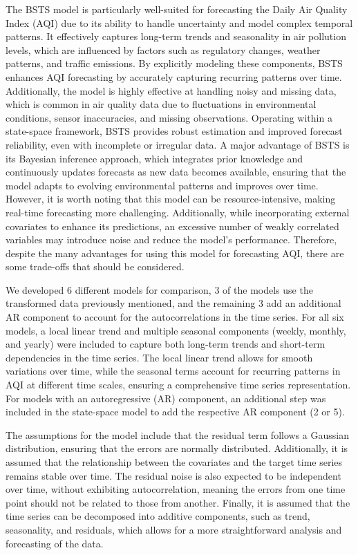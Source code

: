\documentclass[
  12pt,
]{article}
\begin{document}
The BSTS model is particularly well-suited for forecasting the Daily Air
Quality Index (AQI) due to its ability to handle uncertainty and model
complex temporal patterns. It effectively captures long-term trends and
seasonality in air pollution levels, which are influenced by factors
such as regulatory changes, weather patterns, and traffic emissions. By
explicitly modeling these components, BSTS enhances AQI forecasting by
accurately capturing recurring patterns over time. Additionally, the
model is highly effective at handling noisy and missing data, which is
common in air quality data due to fluctuations in environmental
conditions, sensor inaccuracies, and missing observations. Operating
within a state-space framework, BSTS provides robust estimation and
improved forecast reliability, even with incomplete or irregular data. A
major advantage of BSTS is its Bayesian inference approach, which
integrates prior knowledge and continuously updates forecasts as new
data becomes available, ensuring that the model adapts to evolving
environmental patterns and improves over time. However, it is worth
noting that this model can be resource-intensive, making real-time
forecasting more challenging. Additionally, while incorporating external
covariates to enhance its predictions, an excessive number of weakly
correlated variables may introduce noise and reduce the model's
performance. Therefore, despite the many advantages for using this model
for forecasting AQI, there are some trade-offs that should be
considered.

We developed 6 different models for comparison, 3 of the models use the
transformed data previously mentioned, and the remaining 3 add an
additional AR component to account for the autocorrelations in the time
series. For all six models, a local linear trend and multiple seasonal
components (weekly, monthly, and yearly) were included to capture both
long-term trends and short-term dependencies in the time series. The
local linear trend allows for smooth variations over time, while the
seasonal terms account for recurring patterns in AQI at different time
scales, ensuring a comprehensive time series representation. For models
with an autoregressive (AR) component, an additional step was included
in the state-space model to add the respective AR component (2 or 5).

The assumptions for the model include that the residual term follows a
Gaussian distribution, ensuring that the errors are normally
distributed. Additionally, it is assumed that the relationship between
the covariates and the target time series remains stable over time. The
residual noise is also expected to be independent over time, without
exhibiting autocorrelation, meaning the errors from one time point
should not be related to those from another. Finally, it is assumed that
the time series can be decomposed into additive components, such as
trend, seasonality, and residuals, which allows for a more
straightforward analysis and forecasting of the data.
\end{document}
